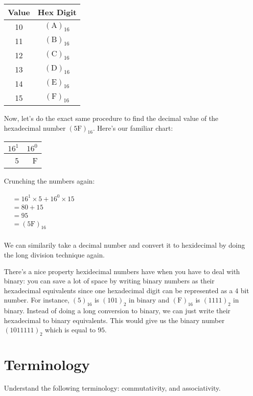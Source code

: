 \begin{tabular}{c c}
  \hline
  Value & Hex Digit \\
  \hline
  10 & $(\text{A})_{16}$ \\
  11 & $(\text{B})_{16}$ \\
  12 & $(\text{C})_{16}$ \\
  13 & $(\text{D})_{16}$ \\
  14 & $(\text{E})_{16}$ \\
  15 & $(\text{F})_{16}$ \\
\end{tabular}

Now, let's do the exact same procedure to find the decimal value of the
hexadecimal number $(5\text{F})_{16}$. Here's our familiar chart:

\begin{center}
  \begin{tabular}{r | r}
    $16^1$ & $16^0$ \\
    \hline
        5  &      F \\
  \end{tabular}
\end{center}

Crunching the numbers again:

\begin{center}
  \begin{math}
    \begin{aligned}
&= 16^1 \times 5 + 16^0 \times 15 \\
&= 80 + 15 \\
&= 95 \\
&= (5\text{F})_{16} \\
    \end{aligned}
  \end{math}
\end{center}

We can similarily take a decimal number and convert it to hexidecimal by doing
the long division technique again.

There's a nice property hexidecimal numbers have when you have to deal with
binary: you can save a lot of space by writing binary numbers as their
hexadecimal equivalents since one hexadecimal digit can be represented as a 4
bit number. For instance, $(5)_{16}$ is $(101)_2$ in binary and
$(\text{F})_{16}$ is $(1111)_2$ in binary. Instead of doing a long conversion to
binary, we can just write their hexadecimal to binary equivalents. This would
give us the binary number $(1011111)_2$ which is equal to $95$.

\section{Terminology}

Understand the following terminology: commutativity, and associativity.
